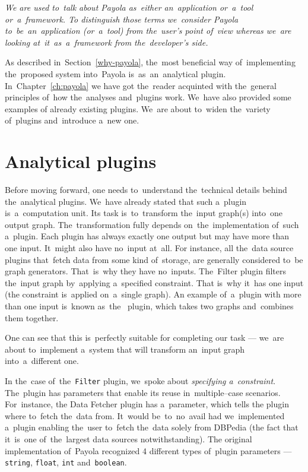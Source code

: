 \begin{sloppypar}
\emph{We are used to~talk about Payola as~either an~application or~a~tool or~a~framework. To
distinguish those terms we~consider Payola to~be~an~application (or~a~tool) from the~user’s
point of~view whereas we~are looking at~it~as~a~framework from the~developer’s side.}
\end{sloppypar}

As described in~Section~\ref{why-payola}, the~most beneficial way of~implementing the~proposed system into~Payola is~as~an~analytical plugin. In~Chapter~\ref{ch:payola}
we have got the~reader acquinted with the~general principles of~how the~analyses and~plugins work. We~have also provided some examples 
of already existing plugins. We~are about to~widen the~variety of~plugins and~introduce a~new one.

\section{Analytical plugins}
Before moving forward, one needs to~understand the~technical 
details behind the~analytical plugins. We~have already stated that such a~plugin is~a~computation unit.
Its task is~to~transform the~input graph(s) into~one output 
graph. The~transformation fully depends on~the~implementation of~such a~plugin.
Each plugin has always exactly one output but may have more than one input.
It~might also have no~input at~all. For instance, all the~data 
source plugins that~fetch data from some kind of~storage, are generally considered to~be
graph generators. That~is~why they have no~inputs. The~Filter 
plugin filters the~input graph by~applying a~specified constraint. That is~why it~has one input (the constraint is~applied on~a~single graph).
An example of~a~plugin with more than one input is~known as~the~ 
plugin, which takes two graphs and~combines them together.

One can see that this is~perfectly suitable for completing our task --- we~are about to~implement a~system that will transform an~input graph into~a~different one.

In the~case of~the~\texttt{Filter} plugin, we~spoke about \emph{specifying a~constraint}. The~plugin has parameters that enable its reuse in~multiple--case scenarios. For~instance,
the Data Fetcher plugin has a~parameter, which tells 
the plugin where to~fetch the~data from. It~would be~to~no~avail had we~implemented a~plugin
enabling the~user to~fetch the~data solely from DBPedia (the fact that it~is~one of~the~largest data
sources notwithstanding).
The original implementation of~Payola recognized 4 different types of~plugin 
parameters --- \texttt{string}, \texttt{float}, \texttt{int} and~\texttt{boolean}. 

